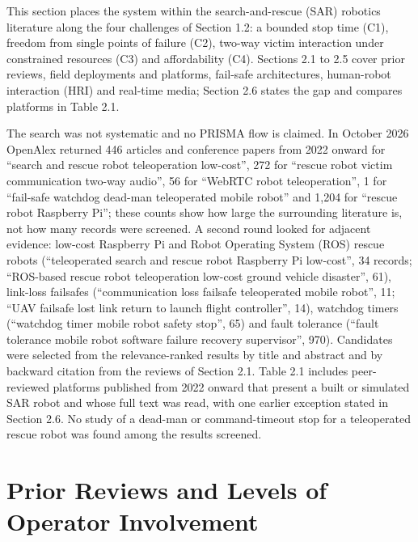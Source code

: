 This section places the system within the search-and-rescue (SAR) robotics literature along the four challenges of Section 1.2: a bounded stop time (C1), freedom from single points of failure (C2), two-way victim interaction under constrained resources (C3) and affordability (C4). Sections 2.1 to 2.5 cover prior reviews, field deployments and platforms, fail-safe architectures, human-robot interaction (HRI) and real-time media; Section 2.6 states the gap and compares platforms in Table 2.1.

The search was not systematic and no PRISMA flow is claimed. In October 2026 OpenAlex returned 446 articles and conference papers from 2022 onward for ``search and rescue robot teleoperation low-cost'', 272 for ``rescue robot victim communication two-way audio'', 56 for ``WebRTC robot teleoperation'', 1 for ``fail-safe watchdog dead-man teleoperated mobile robot'' and 1,204 for ``rescue robot Raspberry Pi''; these counts show how large the surrounding literature is, not how many records were screened. A second round looked for adjacent evidence: low-cost Raspberry Pi and Robot Operating System (ROS) rescue robots (``teleoperated search and rescue robot Raspberry Pi low-cost'', 34 records; ``ROS-based rescue robot teleoperation low-cost ground vehicle disaster'', 61), link-loss failsafes (``communication loss failsafe teleoperated mobile robot'', 11; ``UAV failsafe lost link return to launch flight controller'', 14), watchdog timers (``watchdog timer mobile robot safety stop'', 65) and fault tolerance (``fault tolerance mobile robot software failure recovery supervisor'', 970). Candidates were selected from the relevance-ranked results by title and abstract and by backward citation from the reviews of Section 2.1. Table 2.1 includes peer-reviewed platforms published from 2022 onward that present a built or simulated SAR robot and whose full text was read, with one earlier exception stated in Section 2.6. No study of a dead-man or command-timeout stop for a teleoperated rescue robot was found among the results screened.

\section{Prior Reviews and Levels of Operator Involvement}

